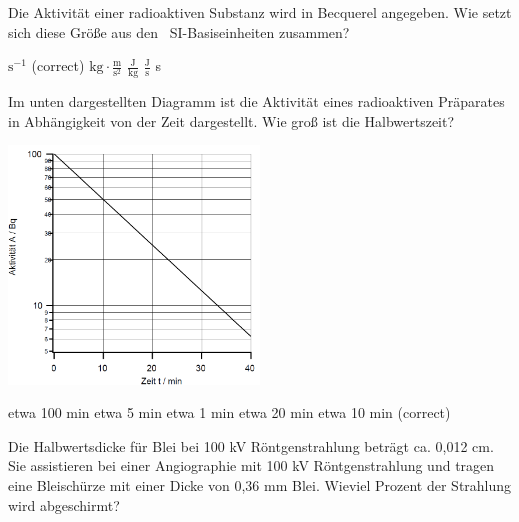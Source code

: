 \documentclass[11pt]{exam}
\begin{document}
\setlength{\voffset}{-0.5in}
\setlength{\headsep}{5pt}

\hspace{2mm}
 \hspace{5mm}
\vspace{4mm}

\begin{questions}

\question Die Aktivität einer radioaktiven Substanz wird in Becquerel angegeben. Wie setzt sich diese Größe aus den  SI-Basiseinheiten zusammen?

\begin{choices}
	\choice \( \text{s}^{-1} \) (correct)
	\choice \( \text{kg}\cdot\frac{\text{m}}{\text{s}^2} \)
	\choice \( \frac{\text{J}}{\text{kg}} \)
	\choice \( \frac{\text{J}}{\text{s}} \)
	\choice s
\end{choices}

\vspace{3mm}\question Im unten dargestellten Diagramm ist die Aktivität eines radioaktiven Präparates in Abhängigkeit von der Zeit dargestellt. Wie groß ist die Halbwertszeit? 

\includegraphics[width=0.5\textwidth]{../../../questions/K/images/zerfallsgesetz.png}

\begin{choices}
	\choice etwa 100 min
	\choice etwa 5 min
	\choice etwa 1 min
	\choice etwa 20 min
	\choice etwa 10 min (correct)
\end{choices}

\vspace{3mm}\question Die Halbwertsdicke für Blei bei 100 kV Röntgenstrahlung beträgt ca. 0,012 cm. Sie assistieren bei einer Angiographie mit 100 kV Röntgenstrahlung und tragen eine Bleischürze mit einer Dicke von 0,36 mm Blei. Wieviel Prozent der Strahlung wird abgeschirmt?


\end{questions}
\end{document}
